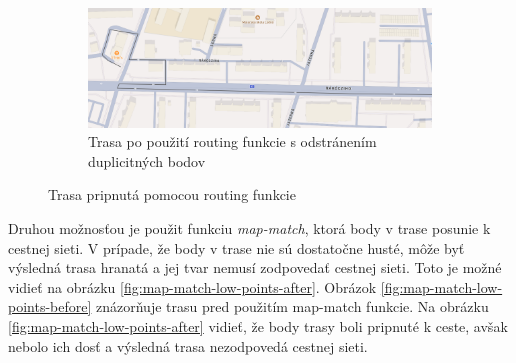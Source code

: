 \begin{figure}
\begin{subfigure}{0.9\textwidth}
        \includegraphics[width=\textwidth]{img/routing/po po.png}
        \caption{Trasa po použití routing funkcie s odstránením duplicitných bodov}
        \label{fig:routing-after-after}
    \end{subfigure}
    \caption{Trasa pripnutá pomocou routing funkcie}
    \label{fig:routing}
\end{figure}

Druhou možnosťou je použit funkciu \textit{map-match}, ktorá body v trase posunie k cestnej sieti. V prípade, že body v trase nie sú dostatočne husté, môže byť výsledná trasa hranatá a jej tvar nemusí zodpovedať cestnej sieti. Toto je možné vidieť na obrázku \ref{fig:map-match-low-points-after}. Obrázok \ref{fig:map-match-low-points-before} znázorňuje trasu pred použitím map-match funkcie. Na obrázku \ref{fig:map-match-low-points-after} vidieť, že body trasy boli pripnuté k ceste, avšak nebolo ich dosť a výsledná trasa nezodpovedá cestnej sieti.

